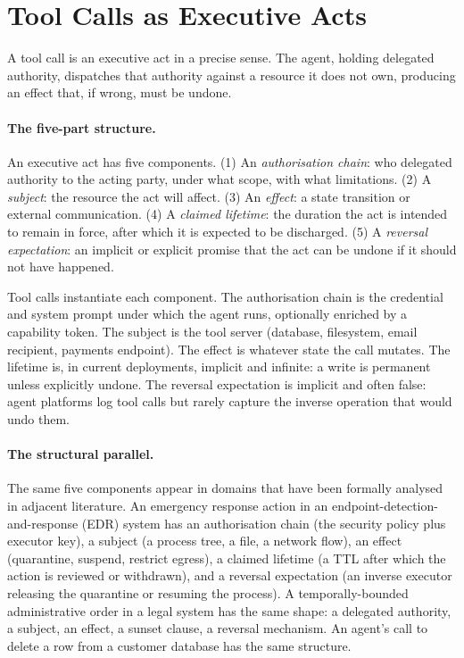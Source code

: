 \section{Tool Calls as Executive Acts}
\label{sec:executive-acts}

A tool call is an executive act in a precise sense. The agent, holding delegated authority, dispatches that authority against a resource it does not own, producing an effect that, if wrong, must be undone.

\paragraph{The five-part structure.}
An executive act has five components. (1) An \emph{authorisation chain}: who delegated authority to the acting party, under what scope, with what limitations. (2) A \emph{subject}: the resource the act will affect. (3) An \emph{effect}: a state transition or external communication. (4) A \emph{claimed lifetime}: the duration the act is intended to remain in force, after which it is expected to be discharged. (5) A \emph{reversal expectation}: an implicit or explicit promise that the act can be undone if it should not have happened.

Tool calls instantiate each component. The authorisation chain is the credential and system prompt under which the agent runs, optionally enriched by a capability token. The subject is the tool server (database, filesystem, email recipient, payments endpoint). The effect is whatever state the call mutates. The lifetime is, in current deployments, implicit and infinite: a write is permanent unless explicitly undone. The reversal expectation is implicit and often false: agent platforms log tool calls but rarely capture the inverse operation that would undo them.

\paragraph{The structural parallel.}
The same five components appear in domains that have been formally analysed in adjacent literature. An emergency response action in an endpoint-detection-and-response (EDR) system has an authorisation chain (the security policy plus executor key), a subject (a process tree, a file, a network flow), an effect (quarantine, suspend, restrict egress), a claimed lifetime (a TTL after which the action is reviewed or withdrawn), and a reversal expectation (an inverse executor releasing the quarantine or resuming the process). A temporally-bounded administrative order in a legal system has the same shape: a delegated authority, a subject, an effect, a sunset clause, a reversal mechanism. An agent's call to delete a row from a customer database has the same structure.

